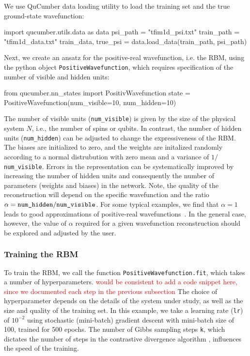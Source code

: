 \documentclass[submission, Phys]{SciPost}
\begin{document}
We use QuCumber data loading utility to load the training set and the true ground-state wavefunction:
\begin{python}
import qucumber.utils.data as data
psi_path = "tfim1d_psi.txt"
train_path = "tfim1d_data.txt"
train_data, true_psi = data.load_data(train_path, psi_path)
\end{python}

Next, we create an ansatz for the positive-real wavefunction, i.e. the RBM, 
using the python object \verb|PositiveWavefunction|,
which requires specification of the number of visible and hidden units:
\begin{python}
from qucumber.nn_states import PositivWavefunction
state = PositiveWavefunction(num_visible=10, num_hidden=10)
\end{python}
The number of visible units (\verb|num_visible|) is given by the size of the physical system $N$, 
i.e., the number of spins or qubits.
In contrast, the number of hidden units (\verb|num_hidden|) can be adjusted to change the expressiveness of the RBM.
The biases are initialized to zero, and the weights are initalized randomly 
according to a normal distrubution with zero mean and a variance of $1/$\verb|num_visible|.
Errors in the representation can be systematically improved by increasing the number of hidden units 
and consequently the number of parameters (weights and biases) in the network.
Note, the quality of the reconstruction will depend on the specific wavefunction and the ratio $\alpha = \verb|num_hidden|/\verb|num_visible|$.
For some typical examples, we find that $\alpha = 1$ leads to good approximations of positive-real wavefunctions~\cite{Torlai2016thermo}.
In the general case, however, the value of $\alpha$ required for a given wavefunction reconstruction should be explored and adjusted by the user.


\subsubsection{Training the RBM}

To train the RBM, we call the function \verb|PositiveWavefunction.fit|, which takes a number of hyperparameters.
\textcolor{red}{would be consistent to add a code snippet here, since we documented each step in the previous subsection}
The choice of hyperparameter depends on the details of the system under study, as well as the size and quality of the training set.
In this example, we take a learning rate (\verb|lr|) of $10^{-2}$ using stochastic (mini-batch) gradient descent with mini-batch size of 100, trained for 500 epochs.
The number of Gibbs sampling steps \verb|k|, which dictates the number of steps in the contrastive divergence algorithm \cite{hinton2002training},
influences the speed of the training. 
\end{document}
